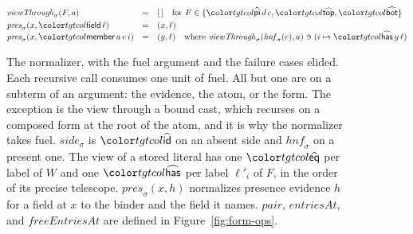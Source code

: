 \begin{figure}
\[\begin{array}{@{}lcl@{}}
\mathit{viewThrough}_\sigma(F, a) & = & \tnil \quad \text{for } F \in \{\form{pi}\,d\,c, \form{top}, \form{bot}\} \\[3pt]
\mathit{pres}_\sigma(x, \ev{field}\,\ell) & = & (x, \ell) \\
\mathit{pres}_\sigma(x, \ev{member}\,a\,e\,i) & = & (y, \ell) \quad \text{where } \mathit{viewThrough}_\sigma(\mathit{hnf}_\sigma(e), a) \ni (i \mapsto \form{has}\,y\,\ell)
\end{array}
\]
\color{black}
\caption{The normalizer, with the fuel argument and the failure cases elided. Each recursive call consumes one unit of fuel. All but one are on a subterm of an argument: the evidence, the atom, or the form. The exception is the view through a bound cast, which recurses on a composed form at the root of the atom, and it is why the normalizer takes fuel. $\mathit{side}_\sigma$ is $\form{id}$ on an absent side and $\mathit{hnf}_\sigma$ on a present one. The view of a stored literal has one $\form{eq}$ per label of $W$ and one $\form{has}$ per label $\ell'_i$ of $F$, in the order of its precise telescope. $\mathit{pres}_\sigma(x, h)$ normalizes presence evidence $h$ for a field at $x$ to the binder and the field it names. $\mathit{pair}$, $\mathit{entriesAt}$, and $\mathit{freeEntriesAt}$ are defined in Figure~\ref{fig:form-ops}.}
\label{fig:normalizer}
\end{figure}

